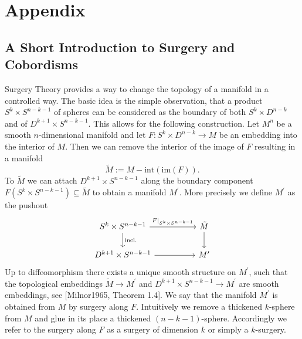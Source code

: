 \appendix
\chapter{Appendix}
\section{A Short Introduction to Surgery and Cobordisms}

Surgery Theory provides a way to change the topology of a manifold in a controlled way. The basic idea is the simple observation, that a product $S^k \times S^{n-k-1}$ of spheres can be considered as the boundary of both $S^k \times D^{n-k}$ and of $D^{k+1} \times S^{n-k-1}$. This allows for the following construction. Let $M^n$ be a smooth $n$-dimensional manifold and let $F \colon S^k \times D^{n-k} \to M$ be an embedding into the interior of $M$. Then we can remove the interior of the image of $F$ resulting in a manifold 
\[
\tilde{M} := M - \mathrm{int}(\mathrm{im}(F)).
\]
To $\tilde{M}$ we can attach $D^{k+1} \times S^{n-k-1}$ along the boundary component $F(S^k \times S^{n-k-1}) \subseteq \tilde{M}$ to obtain a manifold $M^\prime$. More precisely we define $M^\prime$ as the pushout 
\[\begin{tikzcd}[column sep = 1.75cm]
	{S^k \times S^{n-k-1}} & {\tilde{M}} \\
	{D^{k+1} \times S^{n-k-1}} & {M^\prime}
	\arrow["{F|_{S^k \times S^{n-k-1}}}", from=1-1, to=1-2]
	\arrow["{\mathrm{incl.}}", from=1-1, to=2-1]
	\arrow[from=1-2, to=2-2]
	\arrow[from=2-1, to=2-2]
\end{tikzcd}\]
Up to diffeomorphism there exists a unique smooth structure on $M^\prime$, such that the topological embeddings $\tilde{M} \to M^\prime$ and $D^{k+1} \times S^{n-k-1} \to M^\prime$ are smooth embeddings, see [Milnor1965, Theorem 1.4]. We say that the manifold $M^\prime$ is obtained from $M$ by surgery along $F$. Intuitively we remove a thickened $k$-sphere from $M$ and glue in its place a thickened $(n-k-1)$-sphere. Accordingly we refer to the surgery along $F$ as a surgery of dimension $k$ or simply a $k$-surgery. 

